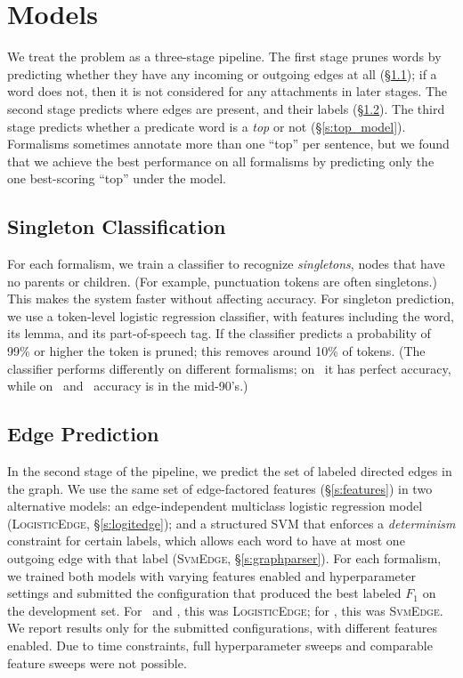 \documentclass[11pt]{article}
\newcommand{\bocomment}[1]{\textcolor{Bittersweet}{[#1 -BTO]}}
\renewcommand{\bocomment}[1]{}
\newcommand{\logitedge}{\textsc{LogisticEdge}}
\newcommand{\svmedge}{\textsc{SvmEdge}}
\begin{document}
\section{Models} \label{s:models}

We treat the problem as a three-stage pipeline.
The first stage prunes words by predicting whether they have any incoming or
outgoing edges at all (\S\ref{s:singleton_model}); 
if a word does not, then it is not 
considered for any attachments in later stages.
The second stage predicts where edges are
present, and their labels (\S\ref{s:edge_model}).
The third stage predicts whether a predicate word is a \emph{top} or not
(\S\ref{s:top_model}).
Formalisms sometimes annotate more than one ``top'' per sentence, but we
found that we achieve the best performance on all formalisms by predicting only
the one best-scoring ``top'' under the model.
\bocomment{Singleton pruning does not matter for LogitEdge.  It doesn't affect accuracy, I'm pretty sure.  But it is essential for the graph model.}



\subsection{Singleton Classification} \label{s:singleton_model}

For each formalism, we train a classifier to recognize \emph{singletons},
nodes that have no parents or children.
(For example, punctuation tokens are often singletons.)
This makes the system faster without affecting accuracy.
For singleton prediction, we use a token-level logistic regression
classifier, with features including
the word, its lemma, and its
part-of-speech tag.
If the classifier predicts a probability of 99\% or higher 
the token is pruned; this removes around 10\% of tokens.
(The classifier performs differently on different formalisms;
on \PAS\ it has perfect accuracy, 
while on
\DM\ and \PCEDT\ accuracy is in the mid-90's.)




\subsection{Edge Prediction} \label{s:edge_model}

In the second stage of the pipeline, we predict the set of labeled directed
edges in the graph.
We use the same set of edge-factored features (\S\ref{s:features}) in two
alternative models: an edge-independent multiclass logistic
regression model (\logitedge, \S\ref{s:logitedge}); and a structured SVM 
\citep{taskar_max_2003,tsochantaridis_support_2004} that enforces a
\emph{determinism} constraint for certain labels, which allows each word to
have at most one outgoing edge with that label (\svmedge,
\S\ref{s:graphparser}).
For each formalism, we trained both models with varying features enabled and
hyperparameter settings and submitted the configuration that produced the best
labeled $F_1$ on the development set.
For \DM\ and \PCEDT, this was \logitedge;
for \PAS, this was \svmedge.
We report results only for the submitted configurations, with different features
enabled.
Due to time constraints, full hyperparameter sweeps and comparable feature sweeps were not possible.
\end{document}
